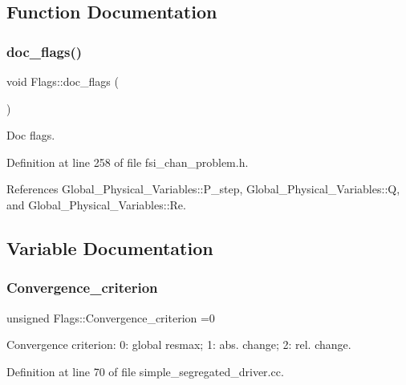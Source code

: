 \subsection{Function Documentation}
\mbox{\label{namespaceFlags_aa7e90522c3f7fbac06fa93f61d88bbd8}} 
\subsubsection{\texorpdfstring{doc\+\_\+flags()}{doc\_flags()}}
{\footnotesize\ttfamily void Flags\+::doc\+\_\+flags (\begin{DoxyParamCaption}{ }\end{DoxyParamCaption})}



Doc flags. 



Definition at line 258 of file fsi\+\_\+chan\+\_\+problem.\+h.



References Global\+\_\+\+Physical\+\_\+\+Variables\+::\+P\+\_\+step, Global\+\_\+\+Physical\+\_\+\+Variables\+::Q, and Global\+\_\+\+Physical\+\_\+\+Variables\+::\+Re.



\subsection{Variable Documentation}
\mbox{\label{namespaceFlags_aba930ff1e462e642a27904df95baab7c}} 
\subsubsection{\texorpdfstring{Convergence\+\_\+criterion}{Convergence\_criterion}}
{\footnotesize\ttfamily unsigned Flags\+::\+Convergence\+\_\+criterion =0}



Convergence criterion\+: 0\+: global resmax; 1\+: abs. change; 2\+: rel. change. 



Definition at line 70 of file simple\+\_\+segregated\+\_\+driver.\+cc.



